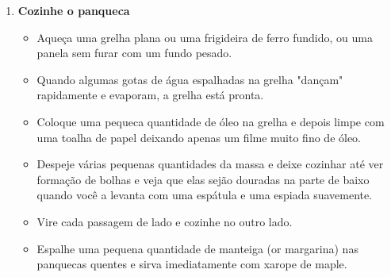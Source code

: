 \documentclass [11pt, letterpaper] {article}
\begin{document}
\begin {description}
\begin {enumerate}
\item {\bf Cozinhe o panqueca}
\begin {itemize}
\item Aqueça uma grelha plana ou uma frigideira de ferro fundido, ou uma panela sem furar com um fundo pesado.
\item Quando algumas gotas de água espalhadas na grelha "dançam" rapidamente e evaporam, a grelha está pronta.
\item Coloque uma pequeca quantidade de \'oleo na grelha e depois
limpe com uma toalha de papel deixando apenas um filme muito fino de \'oleo.
\item Despeje várias pequenas quantidades da massa e deixe cozinhar até ver formação de bolhas e veja que elas sejão douradas na parte de baixo quando você a levanta com uma espátula e uma espiada suavemente.
\item Vire cada passagem de lado e cozinhe no outro lado.
\item Espalhe uma pequena quantidade de manteiga (or margarina) nas panquecas quentes e sirva imediatamente com xarope de maple.
\end {itemize}

\end {enumerate}
\end {description}
\end{document}
